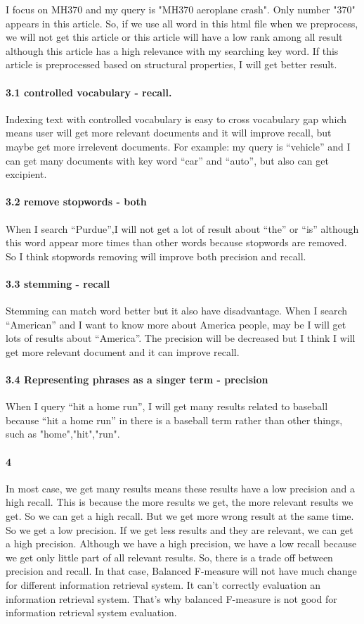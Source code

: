 \documentclass{article}
\begin{document}
	I focus on MH370 and my query is "MH370 aeroplane crash". Only number "370" appears  in this article. So, if we use all word in this html file when we preprocess, we will not get this article or this article will have a low rank among all result although this article has a high relevance with my searching key word. If this article is preprocessed based on structural properties, I will get better result.

	\paragraph{3.1 controlled vocabulary - recall.} Indexing text with controlled vocabulary is easy to cross vocabulary gap which means user will get more relevant documents and it will improve recall, but maybe get more irrelevent documents. For example: my query is “vehicle” and I can get many documents with key word “car” and “auto”, but also can get excipient.
	\paragraph{3.2 remove stopwords - both} When I search “Purdue”,I will not get a lot of result about “the” or “is” although this word appear more times than other words because stopwords are removed. So I think stopwords removing will improve both precision and recall.
	\paragraph{3.3 stemming - recall} Stemming can match word better but it also have disadvantage. When I search “American” and I want to know more about America people, may be I will get lots of results about “America”. The precision will be decreased but I think I will get more relevant document and it can improve recall. 
	\paragraph{3.4 Representing phrases as a singer term - precision} When I query “hit a home run”, I will get many results related to baseball because “hit a home run” in there is a baseball term rather than other things, such as "home","hit","run".
	\paragraph{4}
	In most case, we get many results means these results have a low precision and a high recall. This is because the more results we get, the more relevant results we get. So we can get a high recall. But we get more wrong result at the same time. So we get a low precision. If we get less results and they are relevant, we can get a high precision. Although we have a high precision, we have a low recall because we get only little part of all relevant results.  So, there is a trade off between precision and recall. In that case, Balanced F-measure will not have much change for different information retrieval system. It can't correctly evaluation an information retrieval system. That’s why balanced F-measure is not good for information retrieval system evaluation. 
\end{document}

